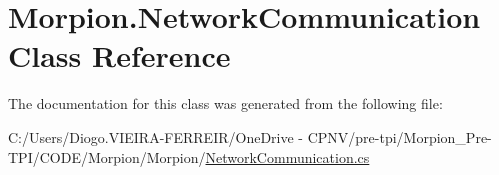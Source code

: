 \hypertarget{class_morpion_1_1_network_communication}{}\section{Morpion.\+Network\+Communication Class Reference}
\label{class_morpion_1_1_network_communication}


The documentation for this class was generated from the following file\+:\begin{DoxyCompactItemize}
\item 
C\+:/\+Users/\+Diogo.\+V\+I\+E\+I\+R\+A-\/\+F\+E\+R\+R\+E\+I\+R/\+One\+Drive -\/ C\+P\+N\+V/pre-\/tpi/\+Morpion\+\_\+\+Pre-\/\+T\+P\+I/\+C\+O\+D\+E/\+Morpion/\+Morpion/\hyperlink{_network_communication_8cs}{Network\+Communication.\+cs}\end{DoxyCompactItemize}
